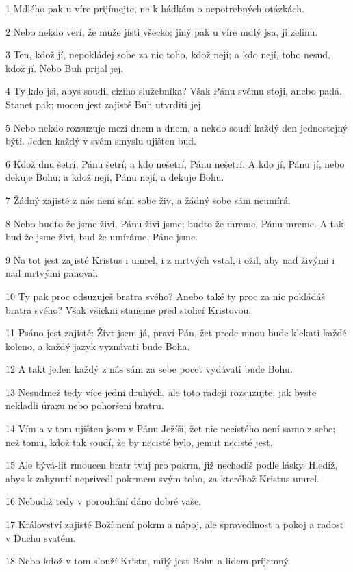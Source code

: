 \par 1 Mdlého pak u víre prijímejte, ne k hádkám o nepotrebných otázkách.
\par 2 Nebo nekdo verí, že muže jísti všecko; jiný pak u víre mdlý jsa, jí zelinu.
\par 3 Ten, kdož jí, nepokládej sobe za nic toho, kdož nejí; a kdo nejí, toho nesud, kdož jí. Nebo Buh prijal jej.
\par 4 Ty kdo jsi, abys soudil cizího služebníka? Však Pánu svému stojí, anebo padá. Stanet pak; mocen jest zajisté Buh utvrditi jej.
\par 5 Nebo nekdo rozsuzuje mezi dnem a dnem, a nekdo soudí každý den jednostejný býti. Jeden každý v svém smyslu ujišten bud.
\par 6 Kdož dnu šetrí, Pánu šetrí; a kdo nešetrí, Pánu nešetrí. A kdo jí, Pánu jí, nebo dekuje Bohu; a kdož nejí, Pánu nejí, a dekuje Bohu.
\par 7 Žádný zajisté z nás není sám sobe živ, a žádný sobe sám neumírá.
\par 8 Nebo budto že jsme živi, Pánu živi jsme; budto že mreme, Pánu mreme. A tak bud že jsme živi, bud že umíráme, Páne jsme.
\par 9 Na tot jest zajisté Kristus i umrel, i z mrtvých vstal, i ožil, aby nad živými i nad mrtvými panoval.
\par 10 Ty pak proc odsuzuješ bratra svého? Anebo také ty proc za nic pokládáš bratra svého? Však všickni staneme pred stolicí Kristovou.
\par 11 Psáno jest zajisté: Živt jsem já, praví Pán, žet prede mnou bude klekati každé koleno, a každý jazyk vyznávati bude Boha.
\par 12 A takt jeden každý z nás sám za sebe pocet vydávati bude Bohu.
\par 13 Nesudmež tedy více jedni druhých, ale toto radeji rozsuzujte, jak byste nekladli úrazu nebo pohoršení bratru.
\par 14 Vím a v tom ujišten jsem v Pánu Ježíši, žet nic necistého není samo z sebe; než tomu, kdož tak soudí, že by necisté bylo, jemut necisté jest.
\par 15 Ale bývá-lit rmoucen bratr tvuj pro pokrm, již nechodíš podle lásky. Hlediž, abys k zahynutí neprivedl pokrmem svým toho, za kteréhož Kristus umrel.
\par 16 Nebudiž tedy v porouhání dáno dobré vaše.
\par 17 Království zajisté Boží není pokrm a nápoj, ale spravedlnost a pokoj a radost v Duchu svatém.
\par 18 Nebo kdož v tom slouží Kristu, milý jest Bohu a lidem príjemný.
